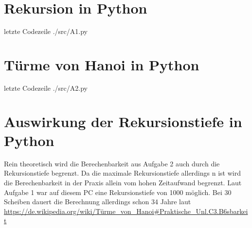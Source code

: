 
\newcommand{\dozent}{Prof. Dr. Claudia Müller-Birn, Barry Linnert}					%
\newcommand{\tutor}{Thierry Meurers}						%
\newcommand{\tutoriumNo}{10}				%
\newcommand{\ubungNo}{04}									%
\newcommand{\veranstaltung}{Objektorientierte Programmierung}	%
\newcommand{\semester}{SoSe 17}						%
\newcommand{\studenten}{Stefaan Hessmann, Jaap Pedersen, Mark Niehues}			%




\section{Rekursion in Python}

 letzte Codezeile
{./src/A1.py}


\section{Türme von Hanoi in Python}
 letzte Codezeile
{./src/A2.py}

\section{Auswirkung der Rekursionstiefe in Python}
Rein theoretisch wird die Berechenbarkeit aus Aufgabe 2 auch durch die Rekursionstiefe begrenzt. Da die maximale Rekursionstiefe allerdings n ist wird die Berechenbarkeit in der Praxis allein vom hohen Zeitaufwand begrenzt. Laut Aufgabe 1 war auf diesem PC eine Rekursionstiefe von 1000 möglich. Bei 30 Scheiben dauert die Berechnung allerdings schon 34 Jahre laut \url{https://de.wikipedia.org/wiki/Türme_von_Hanoi#Praktische_Unl.C3.B6sbarkeit}%

